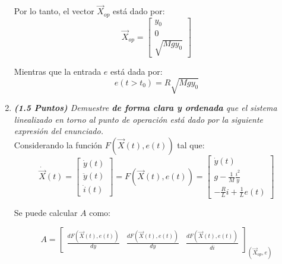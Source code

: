 \begin{enumerate}
Por lo tanto, el vector $\Vec{X}_{op}$ está dado por:
$$\Vec{X}_{op} = \begin{bmatrix} y_0 \\ 0 \\ \sqrt{Mgy_0} \end{bmatrix}$$

Mientras que la entrada $e$ está dada por:
$$e(t>t_0)= R\sqrt{Mgy_0}$$
\item \textit{\textbf{(1.5 Puntos)} Demuestre \textbf{de forma clara y ordenada} que el sistema linealizado en torno al punto de operación está dado por la siguiente expresión del enunciado.}\\

Considerando la función $F(\Vec{X}(t), e(t))$ tal que:
\[
\dot{\Vec{X}}(t) = 
\begin{bmatrix}
\dot{y}(t) \\
\ddot{y}(t) \\
\dot{i}(t)
\end{bmatrix}
= F(\Vec{X}(t), e(t)) =
\begin{bmatrix}
\dot{y}(t) \\
 g - \frac{1}{M}\frac{i^2}{y} \\
-\frac{R}{L}i + \frac{1}{L}e(t)
\end{bmatrix}
\]

Se puede calcular $A$ como:

\[
A = 
\begin{bmatrix}
\frac{d F(\Vec{X}(t), e(t))}{dy} & \frac{d F(\Vec{X}(t), e(t))}{d\dot{y}} & \frac{d F(\Vec{X}(t), e(t))}{d\dot{i}}
\end{bmatrix}_{(\Vec{X}_{op}, e)}
\]


\end{enumerate}
